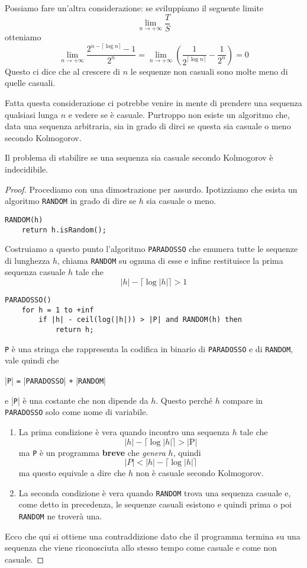 Possiamo fare un'altra considerazione: se sviluppiamo il seguente limite
\[ \lim_{n \rightarrow +\infty} \frac{T}{S} \]
otteniamo
\[
	\lim_{n \rightarrow +\infty} \frac{2^{n - \lceil \log n \rceil} - 1}{2^n} =
	\lim_{n \rightarrow +\infty} \left( \frac{1}{2^{\lceil \log n \rceil}} - \frac{1}{2^n}\right) = 0
\]
Questo ci dice che al crescere di $n$ le sequenze non casuali sono molte meno di quelle casuali.

Fatta questa considerazione ci potrebbe venire in mente di prendere una sequenza qualsiasi lunga $n$ e vedere se \`e
casuale. Purtroppo non esiste un algoritmo che, data una sequenza arbitraria, sia in grado di dirci se questa sia
casuale o meno secondo Kolmogorov.

\begin{theorem}
	Il problema di stabilire se una sequenza sia casuale secondo Kolmogorov \`e indecidibile.
	\begin{proof}
		Procediamo con una dimostrazione per assurdo. Ipotizziamo che esista un algoritmo \verb|RANDOM| in grado di
		dire se $h$ sia casuale o meno.
		\begin{lstlisting}[style=pseudo-style]
RANDOM(h)
	return h.isRandom();
		\end{lstlisting}
		Costruiamo a questo punto l'algoritmo \verb|PARADOSSO| che enumera tutte le sequenze di lunghezza $h$, chiama
		\verb|RANDOM| su ognuna di esse	e infine restituisce la prima sequenza casuale $h$ tale che
		\[ |h| - \lceil \log |h| \rceil > 1 \]
		\begin{lstlisting}[style=pseudo-style]
PARADOSSO()
	for h = 1 to +inf
		if |h| - ceil(log(|h|)) > |P| and RANDOM(h) then
			return h;
		\end{lstlisting}
		\verb|P| \`e una stringa che rappresenta la codifica in binario di \verb|PARADOSSO| e di \verb|RANDOM|, vale
		quindi che
		\begin{center}
			|\verb|P|| \verb|=| |\verb|PARADOSSO|| \verb|+| |\verb|RANDOM||
		\end{center}
		e |\verb|P|| \`e una costante che non dipende da $h$. Questo perch\'e $h$ compare in \verb|PARADOSSO| solo come
		nome di variabile.

		\begin{enumerate}
			\item La prima condizione \`e vera quando incontro una sequenza $h$ tale che
			      \[ |h| - \lceil \log |h| \rceil > |\text{P}| \]
			      ma \verb|P| \`e un programma \textbf{breve} che \emph{genera} $h$, quindi
			      \[ |P| < |h| - \lceil \log |h| \rceil \]
			      ma questo equivale a dire che $h$ non \`e casuale secondo Kolmogorov.
			\item La seconda condizione \`e vera quando \verb|RANDOM| trova una sequenza casuale e, come detto in
			      precedenza, le sequenze casuali esistono e quindi prima o poi \verb|RANDOM| ne trover\`a una.
		\end{enumerate}
		Ecco che qui si ottiene una contraddizione dato che il programma termina su una sequenza che viene riconosciuta
		allo stesso tempo come casuale e come non casuale.
	\end{proof}
\end{theorem}

